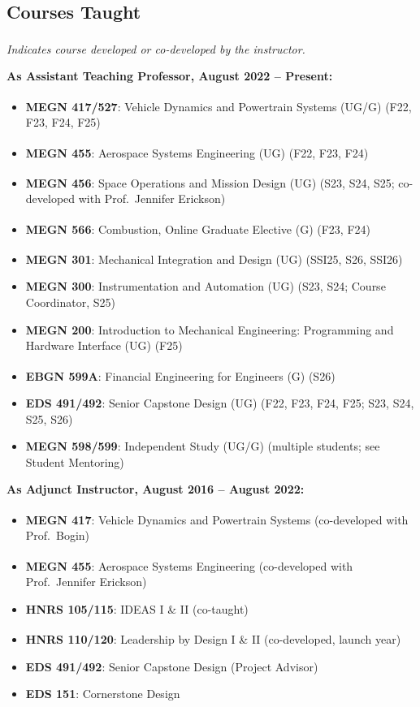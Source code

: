\documentclass[11pt,letterpaper]{article}
\begin{document}
\subsection{Courses Taught}

\noindent\textit{\textsuperscript{\dag} Indicates course developed or co-developed by the instructor.}

\medskip
\noindent\textbf{As Assistant Teaching Professor, August 2022 -- Present:}
\begin{itemize}
  \item \textbf{MEGN 417/527\textsuperscript{\dag}}: Vehicle Dynamics and Powertrain
        Systems (UG/G) (F22, F23, F24, F25)
  \item \textbf{MEGN 455\textsuperscript{\dag}}: Aerospace Systems Engineering (UG)
        (F22, F23, F24)
  \item \textbf{MEGN 456\textsuperscript{\dag}}: Space Operations and Mission Design
        (UG) (S23, S24, S25; co-developed with Prof.\ Jennifer Erickson)
  \item \textbf{MEGN 566\textsuperscript{\dag}}: Combustion, Online Graduate Elective
        (G) (F23, F24)
  \item \textbf{MEGN 301\textsuperscript{\dag}}: Mechanical Integration and Design
        (UG) (SSI25, S26, SSI26)
  \item \textbf{MEGN 300}: Instrumentation and Automation (UG) (S23, S24; Course Coordinator, S25)
  \item \textbf{MEGN 200}: Introduction to Mechanical Engineering: Programming and
        Hardware Interface (UG) (F25)
  \item \textbf{EBGN 599A\textsuperscript{\dag}}: Financial Engineering for Engineers
        (G) (S26)
  \item \textbf{EDS 491/492}: Senior Capstone Design (UG)
        (F22, F23, F24, F25; S23, S24, S25, S26)
  \item \textbf{MEGN 598/599}: Independent Study (UG/G) (multiple students; see
        Student Mentoring)
\end{itemize}

\medskip
\noindent\textbf{As Adjunct Instructor, August 2016 -- August 2022:}
\begin{itemize}
  \item \textbf{MEGN 417\textsuperscript{\dag}}: Vehicle Dynamics and Powertrain Systems
        (co-developed with Prof.\ Bogin)
  \item \textbf{MEGN 455\textsuperscript{\dag}}: Aerospace Systems Engineering
        (co-developed with Prof.\ Jennifer Erickson)
  \item \textbf{HNRS 105/115}: IDEAS I \& II (co-taught)
  \item \textbf{HNRS 110/120\textsuperscript{\dag}}: Leadership by Design I \& II
        (co-developed, launch year)
  \item \textbf{EDS 491/492}: Senior Capstone Design (Project Advisor)
  \item \textbf{EDS 151}: Cornerstone Design
\end{itemize}
\end{document}
